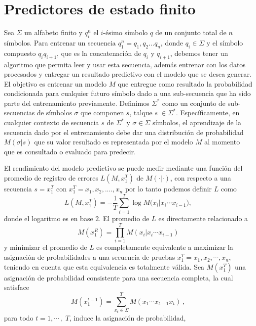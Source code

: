 \section{Predictores de estado finito}


 

Sea $\Sigma$ un alfabeto finito y $q_{i}^{n}$ el $i\mbox{-ésimo}$ símbolo $q$ de un conjunto total de $n$ símbolos. Para entrenar un secuencia $q_{1}^{n}=q_{1},q_{2} \dots q_{n}$, donde $q_{i} \in \Sigma$ y el símbolo compuesto $q_{i}q_{i+1}$, que es la concatenación de $q_{i}$ y $q_{i+1}$, debemos tener un algoritmo que permita leer y usar esta secuencia, además entrenar con los datos procesados y entregar un resultado predictivo con el modelo que se desea generar. El objetivo es entrenar un modelo $M$ que entregue como resultado la probabilidad condicionada para cualquier futuro símbolo dado a una sub-secuencia que ha sido parte del entrenamiento previamente.
Definimos $\Sigma^{*}$ como un conjunto de sub-secuencias de símbolos $\sigma$ que componen $s$, talque $s \ \in \Sigma^{*} $. Específicamente, en cualquier contexto de secuencia $s$ de $\Sigma^{*}$  y  $\sigma \in \Sigma$ símbolos, el aprendizaje de la secuencia dado por el entrenamiento debe dar una distribución de probabilidad $M(\sigma | s )$ que su valor resultado es representada por el modelo $M$ al momento que es consultado o evaluado para predecir.

El rendimiento del modelo predictivo se puede medir mediante una función del promedio de registro de errores $L(M,x_{1}^{T})$ de $M (\cdot | \cdot )$, con respecto a una secuencia $s = x_{1}^{T}$ con $x_{1}^{T}= x_{1},x_{2},....,x_{n} $ %
  por lo tanto podemos definir $L$ como \begin{equation} L( M , x_{1}^{T} ) = 
- \dfrac{1}{T} 
\sum _{i=1}^{T} \log{ M(x_{i} | x_{i} \cdots x_{i-1}} ),\end{equation}
donde el logaritmo es en base $2$.  El promedio de $L$ es directamente relacionado a  \begin{equation}M(x_{1}^{R}) = \prod_{i=1}^{T} M(x_{i} | x_{i} \cdots x_{i-1} ) \end{equation} y minimizar el promedio de $L$ es completamente equivalente a maximizar la asignación de probabilidades a una secuencia de pruebas $x_{1}^{T}= x_{1},x_{2},\cdots,x_{n} $, teniendo en cuenta que esta equivalencia es totalmente válida. 
Sea $M(x_{1}^{T})$ una asignación de probabilidad consistente para una secuencia completa, la cual satisface \begin{equation}
M(x_{1}^{t-1}) = \sum_{\mbox{$x_t$} \in \Sigma}^{T} M(x_{1} \cdots x_{t-1}x_{t} ) \ , 
\end{equation}para todo $t=1,\cdots\ ,\ T$, induce la asignación de probabilidad,

